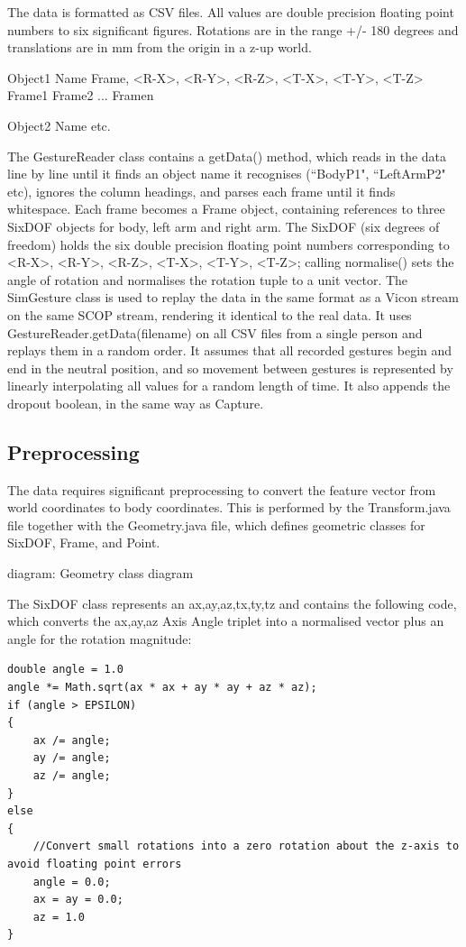 \documentclass[12pt,a4,notitlepage]{report}
\renewcommand{\_}{\texttt{\symbol{95}}}
\newcommand{\<}{\texttt{\symbol{60}}}
\renewcommand{\>}{\texttt{\symbol{62}}}
\begin{document}
The data is formatted as CSV files. All values are double precision floating point numbers to six significant figures. Rotations are in the range +/- 180 degrees and translations are in mm from the origin in a z-up world.

{Object1 Name}
Frame, <R-X>, <R-Y>, <R-Z>, <T-X>, <T-Y>, <T-Z>
{Frame1}
{Frame2}
...
{Framen}

{Object2 Name}
etc.



The GestureReader class contains a getData() method, which reads in the data line by line until it finds an object name it recognises (``BodyP1", ``LeftArmP2" etc), ignores the column headings, and parses each frame until it finds whitespace. Each frame becomes a Frame object, containing references to three SixDOF objects for body, left arm and right arm. The SixDOF (six degrees of freedom) holds the six double precision floating point numbers corresponding to <R-X>, <R-Y>, <R-Z>, <T-X>, <T-Y>, <T-Z>; calling normalise() sets the angle of rotation and normalises the rotation tuple to a unit vector.
The SimGesture class is used to replay the data in the same format as a Vicon stream on the same SCOP stream, rendering it identical to the real data. It uses  GestureReader.getData(filename) on all CSV files from a single person and replays them in a random order. It assumes that all recorded gestures begin and end in the neutral position, and so movement between gestures is represented by linearly interpolating all values for a random length of time. It also appends the dropout boolean, in the same way as Capture.

\subsection{Preprocessing}

The data requires significant preprocessing to convert the feature vector from world coordinates to body coordinates. This is performed by the Transform.java file together with the Geometry.java file, which defines geometric classes for SixDOF, Frame, and Point.

{diagram: Geometry class diagram}

The SixDOF class represents an {ax,ay,az,tx,ty,tz} and contains the following code, which converts the ax,ay,az Axis Angle triplet into a normalised vector plus an angle for the rotation magnitude:

\begin{verbatim}
double angle = 1.0
angle *= Math.sqrt(ax * ax + ay * ay + az * az);
if (angle > EPSILON)
{
	ax /= angle;
	ay /= angle;
	az /= angle;
}
else
{
	//Convert small rotations into a zero rotation about the z-axis to avoid floating point errors
	angle = 0.0;
	ax = ay = 0.0;
	az = 1.0
}
\end{verbatim}
\end{document}
